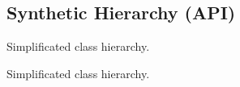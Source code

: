 \hypertarget{group__grpSynthHierarchy}{}\subsection{Synthetic Hierarchy (A\+PI)}
\label{group__grpSynthHierarchy}


Simplificated class hierarchy.  


Simplificated class hierarchy. 

 